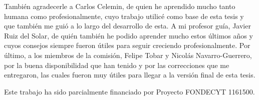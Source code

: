 \documentclass[upright, contnum]{umemoria}
\begin{document}
\begin{thanks}
También agradecerle a Carlos Celemin, de quien he aprendido mucho tanto humana como profesionalmente, cuyo trabajo utilicé como base de esta tesis y que también me guió a lo largo del desarrollo de esta. A mi profesor guía, Javier Ruiz del Solar, de quién también he podido aprender mucho estos últimos años y cuyos consejos siempre fueron útiles para seguir creciendo profesionalmente. Por último, a los miembros de la comisión, Felipe Tobar y Nicolás Navarro-Guerrero, por la buena disponibilidad que han tenido y por las correcciones que me entregaron, las cuales fueron muy útiles para llegar a la versión final de esta tesis.

Este trabajo ha sido parcialmente financiado por Proyecto FONDECYT 1161500.
\end{thanks}

\cleardoublepage
\tableofcontents
\cleardoublepage
\listoftables
\cleardoublepage
\listoffigures

\mainmatter








\newpage
{}




\end{document}

